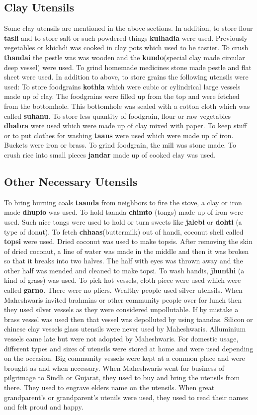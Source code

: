 \subsection{Clay Utensils}
Some clay utensils are mentioned in the above sections. In addition, to store
flour \textbf{tasli} and to store salt or such powdered things \textbf{kulhadia}
were used.
Previously vegetables or khichdi was cooked in clay pots which used to be
tastier.
To crush \textbf{thandai} the pestle was was wooden and the
\textbf{kundo}(special clay made circular deep vessel) were used.
To grind homemade medicines stone made pestle and flat sheet were used.
In addition to above, to store grains the following utensils were used:
To store foodgrains \textbf{kothla} which were cubic or cylindrical large
vessels made up of clay. The foodgrains were filled up from the top and were
fetched from the bottomhole. This bottomhole was sealed with a cotton cloth
which was called \textbf{suhanu}.
To store less quantity of foodgrain, flour or raw vegetables \textbf{dhabra}
were used which were made up of clay mixed with paper.
To keep stuff or to put clothes for washing \textbf{taans} were used which were
made up of iron.
Buckets were iron or brass.
To grind foodgrain, the mill was stone made.
To crush rice into small pieces \textbf{jandar} made up of cooked clay was used.
\subsection{Other Necessary Utensils}
To bring burning coals \textbf{taanda} from neighbors to fire the stove, a clay or iron made
\textbf{dhupio} was used.
To hold taanda \textbf{chimto} (tongs) made up of iron were used. Such nice
tongs were used to hold or turn sweets like \textbf{jalebi} or \textbf{dohti} (a type of
donut).
To fetch \textbf{chhaas}(buttermilk) out of handi, coconut shell called
\textbf{topsi} were used. Dried coconut was used to make topsis. After removing
the skin of dried coconut, a line of water was made in the middle and then it
was broken so that it breaks into two halves. The half with eyes was thrown away
and the other half was mended and cleaned to make topsi.
To wash handis, \textbf{jhunthi} (a kind of grass) was used.
To pick hot vessels, cloth piece were used which were called \textbf{garno}.
There were no pliers. Wealthy people used silver utensils. When Maheshwaris
invited brahmins or other community people over for lunch then they used silver
vessels as they were considered unpollutable. If by mistake a brass vessel was
used then that vessel was depolluted by using taandas.
Silicon or chinese clay vessels glass utensils were never used by Maheshwaris.
Alluminium vessels came late but were not adopted by Maheshwaris. For domestic
usage, different types and sizes of utensils were stored at home and were used
depending on the occasion. Big community vessels were kept at a common place and
were brought as and when necessary.
When Maheshwaris went for business of pilgrimage to Sindh or Gujarat, they used
to buy and bring the utensils from there. They used to engrave elders name on
the utensils. When great grandparent's or grandparent's utenils were used, they
used to read their names and felt proud and happy.

